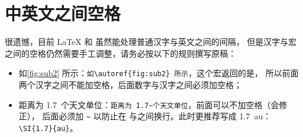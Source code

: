 \section{中英文之间空格}

很遗憾，目前 \LaTeX{} 和 \CTeX{} 虽然能处理普通汉字与英文之间的间隔，
但是汉字与宏之间的空格仍然需要手工调整，请务必按以下的规则撰写原稿：
\begin{itemize}
  \item[\ding{51}] 如\autoref{fig:sub2} 所示：\verb|如\autoref{fig:sub2} 所示|，这个宏返回的是，
  所以前面两个汉字之间不能加空格，后面数字与汉字之间必须加空格；
  \item[\ding{51}] 距离为 1.7~个天文单位：\verb|距离为 1.7~个天文单位|，前面可以不加空格（\CTeX 会修正），
  后面必须加 \verb|~| 以防止在 与之间换行。此时更推荐写成 \SI{1.7}{au}：\verb|\SI{1.7}{au}|。
\end{itemize}

